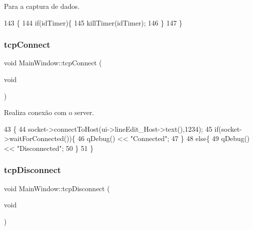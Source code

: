 Para a captura de dados. 


\begin{DoxyCode}
143                              \{
144     \textcolor{keywordflow}{if}(idTimer)\{
145         killTimer(idTimer);
146     \}
147 \}
\end{DoxyCode}
\mbox{\label{class_main_window_a26b6030035e196b64333906db8302cdd}} 
\subsubsection{\texorpdfstring{tcp\+Connect}{tcpConnect}}
{\footnotesize\ttfamily void Main\+Window\+::tcp\+Connect (\begin{DoxyParamCaption}\item[{void}]{ }\end{DoxyParamCaption})\hspace{0.3cm}{\ttfamily [slot]}}



Realiza conexão com o server. 


\begin{DoxyCode}
43                            \{
44     socket->connectToHost(ui->lineEdit\_Host->text(),1234);
45     \textcolor{keywordflow}{if}(socket->waitForConnected())\{
46         qDebug() << \textcolor{stringliteral}{"Connected"};
47     \}
48     \textcolor{keywordflow}{else}\{
49         qDebug() << \textcolor{stringliteral}{"Disconnected"};
50     \}
51 \}
\end{DoxyCode}
\mbox{\label{class_main_window_a3389bbbe4222f115a7609037a1a63bd5}} 
\subsubsection{\texorpdfstring{tcp\+Disconnect}{tcpDisconnect}}
{\footnotesize\ttfamily void Main\+Window\+::tcp\+Disconnect (\begin{DoxyParamCaption}\item[{void}]{ }\end{DoxyParamCaption})\hspace{0.3cm}{\ttfamily [slot]}}



